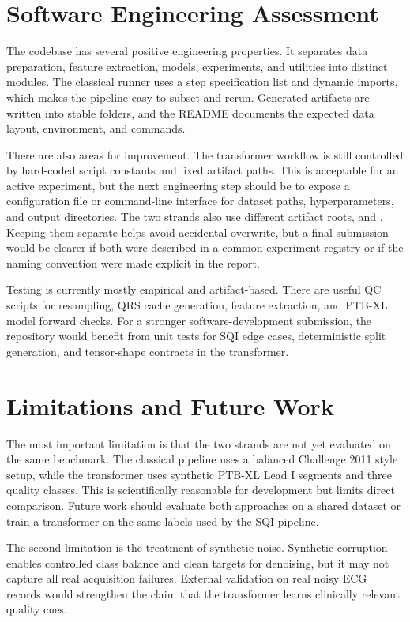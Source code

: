 \documentclass[11pt,a4paper]{article}
\begin{document}
\section{Software Engineering Assessment}

The codebase has several positive engineering properties. It separates data preparation, feature extraction, models, experiments, and utilities into distinct modules. The classical runner uses a step specification list and dynamic imports, which makes the pipeline easy to subset and rerun. Generated artifacts are written into stable folders, and the README documents the expected data layout, environment, and commands.

There are also areas for improvement. The transformer workflow is still controlled by hard-coded script constants and fixed artifact paths. This is acceptable for an active experiment, but the next engineering step should be to expose a configuration file or command-line interface for dataset paths, hyperparameters, and output directories. The two strands also use different artifact roots,  and . Keeping them separate helps avoid accidental overwrite, but a final submission would be clearer if both were described in a common experiment registry or if the naming convention were made explicit in the report.

Testing is currently mostly empirical and artifact-based. There are useful QC scripts for resampling, QRS cache generation, feature extraction, and PTB-XL model forward checks. For a stronger software-development submission, the repository would benefit from unit tests for SQI edge cases, deterministic split generation, and tensor-shape contracts in the transformer.

\section{Limitations and Future Work}

The most important limitation is that the two strands are not yet evaluated on the same benchmark. The classical pipeline uses a balanced Challenge 2011 style setup, while the transformer uses synthetic PTB-XL Lead I segments and three quality classes. This is scientifically reasonable for development but limits direct comparison. Future work should evaluate both approaches on a shared dataset or train a transformer on the same labels used by the SQI pipeline.

The second limitation is the treatment of synthetic noise. Synthetic corruption enables controlled class balance and clean targets for denoising, but it may not capture all real acquisition failures. External validation on real noisy ECG records would strengthen the claim that the transformer learns clinically relevant quality cues.
\end{document}
